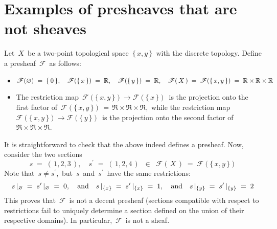 

\vskip 0.5cm
\section{Examples of presheaves that are not sheaves}


\renewcommand{\theenumi}{\roman{enumi}}
\renewcommand{\labelenumi}{\textnormal{(\theenumi)}$\;\;$}


\begin{example}
\mbox{}\vskip 0.1cm
\noindent
Let \,$X$\, be a two-point topological space \,$\{\,x,y\,\}$\, with the discrete topology.
Define a presheaf \,$\mathscr{F}$\, as follows:
\begin{itemize}
\item
	$
	\mathscr{F}(\varnothing) \;=\; \{\,0\,\},
	\quad
	\mathscr{F}(\{\,x\,\}) \;=\; \mathbb{R},
	\quad
	\mathscr{F}(\{\,y\,\}) \;=\; \mathbb{R},
	\quad
	\mathscr{F}(\,X\,) \;=\; \mathscr{F}(\{\,x,y\,\}) \;=\; \mathbb{R} \times \mathbb{R} \times \mathbb{R}
	$
\item
	The restriction map
	\,$\mathscr{F}(\{\,x,y\,\}) \longrightarrow \mathscr{F}(\{\,x\,\})$\,
	is the projection onto the first factor of
	\,$\mathscr{F}(\{\,x,y\,\}) \,=\, \Re \times \Re \times \Re$,\,
	while the restriction map
	\,$\mathscr{F}(\{\,x,y\,\}) \longrightarrow \mathscr{F}(\{\,y\,\})$\,
	is the projection onto the second factor of \,$\Re \times \Re \times \Re$.\,
\end{itemize}
It is straightforward to check that the above indeed defines a presheaf.
Now, consider the two sections
\begin{equation*}
s \;=\; (\,1,2,3\,), \quad s^{\prime} \;=\; (\,1,2,4\,) \;\;\in\;\; \mathscr{F}(\,X\,) \;=\; \mathscr{F}(\{\,x,y\,\})
\end{equation*}
Note that \,$s \neq s^{\prime}$,\, but \,$s$\, and \,$s^{\prime}$\, have the same restrictions:
\begin{equation*}
s\,\vert_{\varnothing} \;=\; s^{\prime}\,\vert_{\varnothing} \;=\; 0,
\quad\textnormal{and}\quad
s\,\vert_{\{x\}} \;=\; s^{\prime}\,\vert_{\{x\}} \;=\; 1,
\quad\textnormal{and}\quad
s\,\vert_{\{y\}} \;=\; s^{\prime}\,\vert_{\{y\}} \;=\; 2
\end{equation*}
This proves that \,$\mathscr{F}$\, is not a decent presheaf
(sections compatible with respect to restrictions fail to uniquely determine a section defined on the union of their respective domains).
In particular, \,$\mathscr{F}$\, is not a sheaf.
\end{example}

